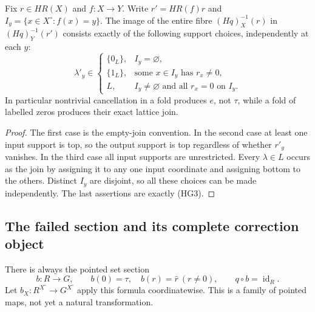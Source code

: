 \begin{proposition}\label{HG:fibretransport}
Fix $r\in HR(X)$ and $f:X\to Y$.  Write $r'=HR(f)r$ and
$I_y=\{x\in X^\circ:f(x)=y\}$.  The image of the entire
fibre $(Hq)_X^{-1}(r)$ in $(Hq)_Y^{-1}(r')$ consists exactly
of the following support choices, independently at each $y$:
\begin{equation}\tag{HG11}
 \lambda'_y\in
 \begin{cases}
 \{0_L\},& I_y=\varnothing,\\
 \{1_L\},&\text{some }x\in I_y\text{ has }r_x\ne0,\\
 L,&I_y\ne\varnothing\text{ and all }r_x=0\text{ on }I_y.
 \end{cases}
\end{equation}
In particular nontrivial cancellation in a fold produces $e$,
not $\tau$, while a fold of labelled zeros produces their exact
lattice join.
\end{proposition}
\begin{proof}
The first case is the empty-join convention.  In the second case
at least one input support is top, so the output support is top
regardless of whether $r'_y$ vanishes.  In the third case all
input supports are unrestricted.  Every $\lambda\in L$ occurs
as the join by assigning it to any one input coordinate and
assigning bottom to the others.  Distinct $I_y$ are disjoint,
so all these choices can be made independently.  The last
assertions are exactly (HG3).
\end{proof}

\subsection{The failed section and its complete correction object}

There is always the pointed set section
\begin{equation}\tag{HG12}
 b:R\to G,\qquad b(0)=\tau,\quad b(r)=\widehat r\ (r\ne0),
 \qquad q\circ b=\operatorname{id}_R.
\end{equation}
Let $b_X:R^{X^\circ}\to G^{X^\circ}$ apply this formula
coordinatewise.  This is a family of pointed maps, not yet a
natural transformation.

